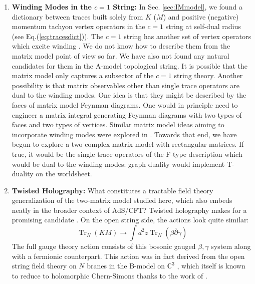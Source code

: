 \documentclass[english]{article}
\DeclareMathOperator{\Tr}{Tr}
\renewcommand{\>}{\rangle}
\newcommand{\<}{\langle}
\renewcommand{\(}{\left(}
\renewcommand{\)}{\right)}
\begin{document}
\begin{enumerate}
The additional perturbation generates \textit{internal} vertices to the Feynman diagrams. On the worldsheet, these internal vertices correspond to the additional insertions coming from the integrated vertex operators in Eq.(\ref{eq:defstringaction}). 

It would be very interesting to understand how the picture of discrete lattice points on moduli space gets modified as we turn on interactions. As suggested in \cite{gaberdiel2021symmetric}, there is an expectation that the delta-functions in the moduli space integrand supported on these discrete points get smoothed out, with a characteristic width set by the 't Hooft coupling constant.\footnote{EAM thanks Beat Nairz for discussions of this mechanism in the context of the string dual to the symmetric orbifold of $\mathbb{T}^{4}$.} 

\item{\textbf{Winding Modes in the $c=1$ String:} In Sec. \ref{sec:IMmodel}, we found a dictionary between traces built solely from $K$ ($M$) and positive (negative) momentum tachyon vertex operators in the $c=1$ string at self-dual radius (see Eq.(\ref{eq:tracesdict})). The $c=1$ string has another set of vertex operators which excite winding \cite{grossKlc=1}. We do not know how to describe them from the matrix model point of view so far. We have also not found any natural candidates for them in the A-model topological string. It is possible that the matrix model only captures a subsector of the $c=1$ string theory. Another possibility is that matrix observables other than single trace operators are dual to the winding modes. One idea is that they might be described by the faces of matrix model Feynman diagrams. One would in principle need to engineer a matrix integral generating Feynman diagrams with two types of faces and two types of vertices. Similar matrix model ideas aiming to incorporate winding modes were explored in \cite{Dijkgraaf:2003xk, AlexandrovNormal, Alexandrov:2002fh, KostovWindingMM}. Towards that end, we have begun to explore a two complex matrix model with rectangular matrices. If true, it would be the single trace operators of the F-type description which would be dual to the winding modes: graph duality would implement T-duality on the worldsheet. }

\item{\textbf{Twisted Holography:}} What constitutes a tractable field theory generalization of the two-matrix model studied here, which also embeds neatly in the broader context of AdS/CFT? Twisted holography makes for a promising candidate  \cite{CostelloGaiottoTH, Budzik:2021fyh, Costello:2020jbh}. On the open string side, the actions look quite similar:
\begin{equation}
    \Tr_{N}(KM) \rightarrow \int d^{2}z \Tr_{N}(\beta \bar{\partial} \gamma) 
\end{equation}
The full gauge theory action consists of this bosonic gauged $\beta, \gamma$ system along with a fermionic counterpart. This action was in fact derived from the open string field theory on $N$ branes in the B-model on $\mathbb{C}^{3}$ \cite{CostelloGaiottoTH}, which itself is known to reduce to holomorphic Chern-Simons thanks to the work of \cite{WittenCSasOSFT}.


\end{enumerate}
\end{document}
